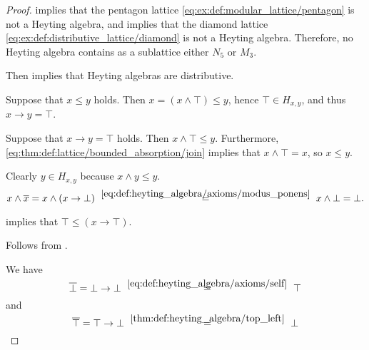 \begin{proof}
    implies that the pentagon lattice \eqref{eq:ex:def:modular_lattice/pentagon} is not a Heyting algebra, and  implies that the diamond lattice \eqref{eq:ex:def:distributive_lattice/diamond} is not a Heyting algebra. Therefore, no Heyting algebra contains as a sublattice either \( N_5 \) or \( M_3 \).

  Then  implies that Heyting algebras are distributive.


  \SufficiencySubProof* Suppose that \( x \leq y \) holds. Then \( x = (x \wedge \top) \leq y \), hence \( \top \in H_{x,y} \), and thus \( x \rightarrow y = \top \).

  \NecessitySubProof* Suppose that \( x \rightarrow y = \top \) holds. Then \( x \wedge \top \leq y \). Furthermore, \eqref{eq:thm:def:lattice/bounded_absorption/join} implies that \( x \wedge \top = x \), so \( x \leq y \).

   Clearly \( y \in H_{x,y} \) because \( x \wedge y \leq y \).

  \begin{equation*}
    x \wedge \oline{x}
    =
    x \wedge (x \rightarrow \bot)
    \reloset {\eqref{eq:def:heyting_algebra/axioms/modus_ponens}} =
    x \wedge \bot
    =
    \bot.
  \end{equation*}

    implies that \( \top \leq (x \rightarrow \top) \).

   Follows from .

   We have
  \begin{equation*}
    \oline{\bot}
    =
    \bot \rightarrow \bot
    \reloset {\eqref{eq:def:heyting_algebra/axioms/self}} =
    \top
  \end{equation*}
  and
  \begin{equation*}
    \oline{\top}
    =
    \top \rightarrow \bot
    \reloset {\ref{thm:def:heyting_algebra/top_left}} =
    \bot
  \end{equation*}


\end{proof}
